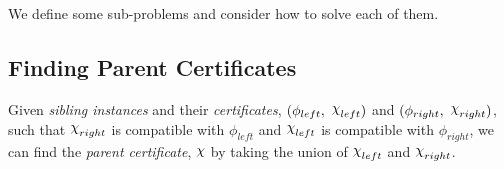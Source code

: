 We define some sub-problems and consider how to solve each of them.


\subsection*{Finding Parent Certificates}

Given \textit{sibling instances} and their \textit{certificates}, $(\phi_{left},~ \rchi_{left})$ and $(\phi_{right},~ \rchi_{right})$, such that $\rchi_{right}$ is compatible with $\phi_{left}$ and $\rchi_{left}$ is compatible with $\phi_{right}$, we can find the \textit{parent certificate}, $\rchi$ by taking the union of $\rchi_{left}$ and $\rchi_{right}$.
